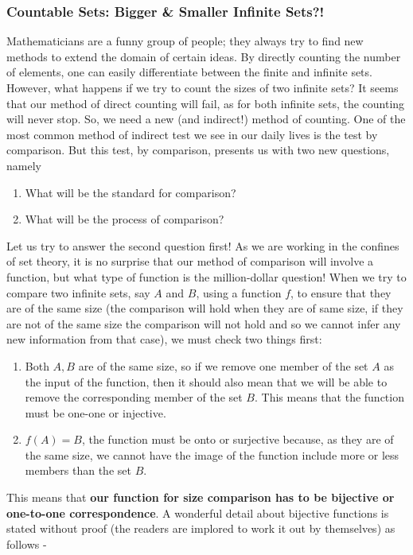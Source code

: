 \subsubsection{Countable Sets: Bigger \& Smaller Infinite Sets?!}
Mathematicians are a funny group of people; they always try to find new methods to extend the domain of certain ideas. By directly counting the number of elements, one can easily differentiate between the finite and infinite sets. However, what happens if we try to count the sizes of two infinite sets? It seems that our method of direct counting will fail, as for both infinite sets, the counting will never stop. So, we need a new (and indirect!) method of counting. One of the most common method of indirect test we see in our daily lives is the test by comparison. But this test, by comparison, presents us with two new questions, namely
\begin{enumerate}
    \item What will be the standard for comparison?
    \item What will be the process of comparison?
\end{enumerate}
Let us try to answer the second question first! As we are working in the confines of set theory, it is no surprise that our method of comparison will involve a function, but what type of function is the million-dollar question! When we try to compare two infinite sets, say $A$ and $B$, using a function $f$, to ensure that they are of the same size (the comparison will hold when they are of same size, if they are not of the same size the comparison will not hold and so we cannot infer any new information from that case), we must check two things first:
\begin{enumerate}
    \item Both $A, B$ are of the same size, so if we remove one member of the set $A$ as the input of the function, then it should also mean that we will be able to remove the corresponding member of the set $B$. This means that the function must be one-one or injective.
    \item $f(A)=B$, the function must be onto or surjective because, as they are of the same size, we cannot have the image of the function include more or less members than the set $B$.
\end{enumerate}
This means that \textbf{our function for size comparison has to be bijective or one-to-one correspondence}. A wonderful detail about bijective functions is stated without proof (the readers are implored to work it out by themselves) as follows -
